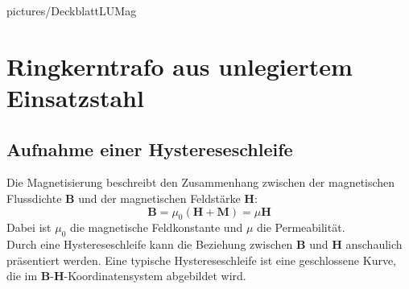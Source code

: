 \documentclass[a4paper,twoside,12pt,DIV=13,BCOR=5mm,numbers=noenddot,cleardoublepage=empty]{scrbook}
\begin{document}
\renewcommand{\baselinestretch}{1.25}
\newcommand{\StudentA}{Marton Harsch}
\newcommand{\MatrNrA}{12123680}
\newcommand{\StudentB}{Michael Malburg}
\newcommand{\MatrNrB}{61806515}
\newcommand{\StudentC}{Jonathan Gamperl}
\newcommand{\MatrNrC}{12302766}

\newcommand{\LUDatum}{22.4.2024}
\newcommand{\LUGruppe}{}
\newcommand{\LUBetreuer}{}

\large

{pictures/DeckblattLUMag}     %

\setcounter{chapter}{0}


\chapter{Ringkerntrafo aus unlegiertem Einsatzstahl}
\section{Aufnahme einer Hystereseschleife}

    Die Magnetisierung beschreibt den Zusammenhang zwischen der magnetischen Flussdichte $\textbf{B}$ und der magnetischen Feldstärke $\textbf{H}$:
    \begin{equation}
        \textbf{B} = \mu_0 (\textbf{H} + \textbf{M}) = \mu\textbf{H}
    \end{equation} 
    Dabei ist $\mu_0$ die magnetische Feldkonstante und $\mu$ die Permeabilität. \\
    Durch eine Hystereseschleife kann die Beziehung zwischen $\textbf{B}$ und $\textbf{H}$ anschaulich präsentiert werden. Eine typische Hystereseschleife ist eine geschlossene Kurve, die im \textbf{B}-\textbf{H}-Koordinatensystem abgebildet wird. \\
    
\end{document}
